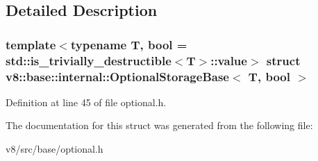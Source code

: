 \subsection{Detailed Description}
\subsubsection*{template$<$typename T, bool = std\+::is\+\_\+trivially\+\_\+destructible$<$\+T$>$\+::value$>$\newline
struct v8\+::base\+::internal\+::\+Optional\+Storage\+Base$<$ T, bool $>$}



Definition at line 45 of file optional.\+h.



The documentation for this struct was generated from the following file\+:\begin{DoxyCompactItemize}
\item 
v8/src/base/optional.\+h\end{DoxyCompactItemize}
